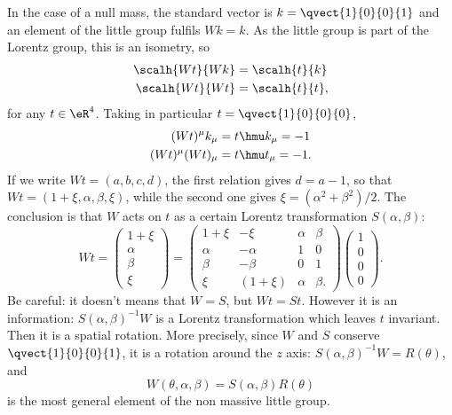 In the case of a null mass, the standard vector is $k=\qvect{1}{0}{0}{1}$ and an element of the little group fulfils $Wk=k$. As the little group is part of the Lorentz group, this is an isometry, so
\begin{subequations}
\begin{align}
  \scalh{Wt}{Wk}&=\scalh{t}{k}\\
  \scalh{Wt}{Wt}&=\scalh{t}{t},
\end{align}  
\end{subequations}
for any $t\in\eR^4$. Taking in particular $t=\qvect{1}{0}{0}{0}$,
\begin{subequations}
\begin{align}
  (Wt)^{\mu}k_{\mu}&=t\hmu k_{\mu}=-1\\
  (Wt)^{\mu}(Wt)_{\mu}&=t\hmu t_{\mu}=-1.  
\end{align}  
\end{subequations}
If we write $Wt=({a},{b},{c},{d})$,  the first relation gives $d=a-1$, so that  $Wt=({1+\xi},{\alpha},{\beta},{\xi})$, while the second one gives $\xi=(\alpha^2+\beta^2)/2$. The conclusion is that $W$ acts on $t$ as a certain Lorentz transformation $S(\alpha,\beta)$:
\begin{equation}
Wt=\begin{pmatrix}
     1+\xi\\
     \alpha\\
     \beta\\
     \xi
   \end{pmatrix}=
   \begin{pmatrix}
     1+\xi  & -\xi    & \alpha & \beta\\
     \alpha & -\alpha &   1    &   0\\
     \beta  & -\beta  &   0    &   1\\
     \xi    & (1+\xi) & \alpha & \beta.
   \end{pmatrix}
   \begin{pmatrix}
     1\\
     0\\
     0\\
     0
   \end{pmatrix}.
\end{equation}
Be careful: it doesn't means that $W=S$, but $Wt=St$. However it is an information: $S(\alpha,\beta)^{-1} W$ is a Lorentz transformation which leaves $t$ invariant. Then it is a spatial rotation. More precisely, since $W$ and $S$ conserve $\qvect{1}{0}{0}{1}$, it is a rotation around the $z$ axis: $S(\alpha,\beta)^{-1} W=R(\theta)$, and
\begin{equation}
  W(\theta,\alpha,\beta)=S(\alpha,\beta)R(\theta)
\end{equation}
is the most general element of the non massive little group.
